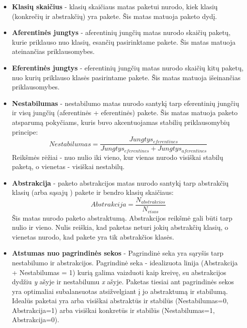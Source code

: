 \begin{itemize}
    \item \textbf{Klasių skaičius} - klasių skaičiaus matas paketui nurodo, kiek klasių (konkrečių ir abstrakčių) yra pakete.
    Šis matas matuoja paketo dydį.
    \item \textbf{Aferentinės jungtys } - aferentinių jungčių matas nurodo
    skaičių paketų, kurie priklauso nuo klasių, esančių pasirinktame pakete.
    Šis matas matuoja ateinančias priklausomybes.
    \item \textbf{Eferentinės jungtys } - eferentinių jungčių matas nurodo skaičių kitų paketų,
    nuo kurių priklauso klasės pasirintame pakete.
    Šis matas matuoja išeinančias priklausomybes.
    \item \textbf{Nestabilumas} - nestabilumo matas nurodo santykį tarp eferentinių jungčių ir
    visų jungčių (aferentinės + eferentinės) pakete.
    Šis matas matuoja paketo atsparumą pokyčiams, kuris buvo akcentuojamas stabilių priklausomybių principe:
    \begin{equation}
        Nestabilumas=\frac{Jungtys_{eferentines}}{Jungtys_{eferentines} + Jungtys_{aferentines}}
    \end{equation}
    Reikšmės rėžiai - nuo nulio iki vieno, kur vienas nurodo visiškai stabilų paketą, o vienetas - visiškai nestabilų.
    \item \textbf{Abstrakcija} - paketo abstrakcijos matas nurodo santykį tarp abstrakčių klasių (arba sąsajų ) pakete ir bendro klasių skaičiaus:
    \begin{equation}
        Abstrakcija=\frac{N_{abstrakcios}}{N_{visos}}
    \end{equation}
    Šis matas nurodo paketo abstraktumą.
    Abstrakcijos reikšmė gali būti tarp nulio ir vieno.
    Nulis reiškia, kad paketas neturi jokių abstrakčių klasių, o vienetas nurodo, kad pakete yra tik abstrakčios klasės.
    \item \textbf{Atstumas nuo pagrindinės sekos} -
    Pagrindinė seka yra sąryšis tarp nestabilumo ir abstrakcijos.
    Pagrindinė seka - idealizuota linija (Abstrakcija + Nestabilumas = 1)  kurią galima vaizduoti kaip kreivę, su abstrakcijos dydžiu \textit{y} ašyje ir nestabilumu \textit{x} ašyje.
    Paketas tiesiai ant pagrindinės sekos yra optimaliai subalansuotas atsižvelgiant į jo abstraktumą ir stabilumą.
    Idealūs paketai yra arba visiškai abstraktūs ir stabilūs (Nestabilumas=0, Abstrakcija=1) arba visiškai konkretūs ir stabilūs (Nestabilumas=1, Abstrakcija=0).

\end{itemize}
